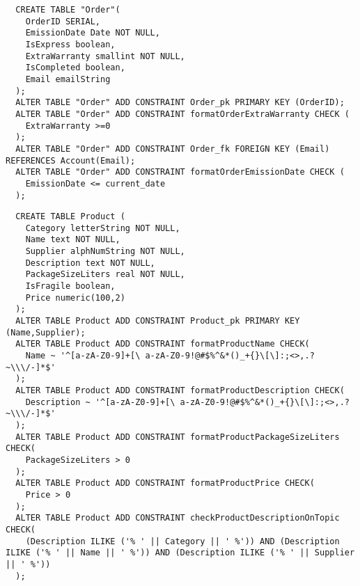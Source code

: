 \begin{lstlisting}
  CREATE TABLE "Order"(
    OrderID SERIAL, 
    EmissionDate Date NOT NULL,
    IsExpress boolean,
    ExtraWarranty smallint NOT NULL,
    IsCompleted boolean,
    Email emailString
  );
  ALTER TABLE "Order" ADD CONSTRAINT Order_pk PRIMARY KEY (OrderID);
  ALTER TABLE "Order" ADD CONSTRAINT formatOrderExtraWarranty CHECK (
    ExtraWarranty >=0
  );
  ALTER TABLE "Order" ADD CONSTRAINT Order_fk FOREIGN KEY (Email) REFERENCES Account(Email);
  ALTER TABLE "Order" ADD CONSTRAINT formatOrderEmissionDate CHECK (
    EmissionDate <= current_date
  );
\end{lstlisting}

\begin{lstlisting}
  CREATE TABLE Product (
    Category letterString NOT NULL,
    Name text NOT NULL,
    Supplier alphNumString NOT NULL,
    Description text NOT NULL,
    PackageSizeLiters real NOT NULL,
    IsFragile boolean,
    Price numeric(100,2)
  );
  ALTER TABLE Product ADD CONSTRAINT Product_pk PRIMARY KEY (Name,Supplier);
  ALTER TABLE Product ADD CONSTRAINT formatProductName CHECK(
    Name ~ '^[a-zA-Z0-9]+[\ a-zA-Z0-9!@#$%^&*()_+{}\[\]:;<>,.?~\\\/-]*$'
  );
  ALTER TABLE Product ADD CONSTRAINT formatProductDescription CHECK(
    Description ~ '^[a-zA-Z0-9]+[\ a-zA-Z0-9!@#$%^&*()_+{}\[\]:;<>,.?~\\\/-]*$'
  );
  ALTER TABLE Product ADD CONSTRAINT formatProductPackageSizeLiters CHECK(
    PackageSizeLiters > 0
  );
  ALTER TABLE Product ADD CONSTRAINT formatProductPrice CHECK(
    Price > 0
  );
  ALTER TABLE Product ADD CONSTRAINT checkProductDescriptionOnTopic CHECK(
    (Description ILIKE ('% ' || Category || ' %')) AND (Description ILIKE ('% ' || Name || ' %')) AND (Description ILIKE ('% ' || Supplier || ' %'))
  );
\end{lstlisting}

